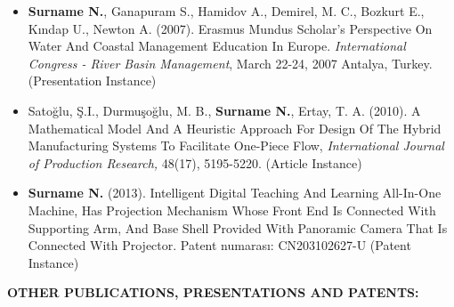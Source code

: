 \begin{itemize}

   \item {\bf Surname N.}, Ganapuram S., Hamidov A., Demirel, M. C., Bozkurt E., Kındap U., Newton A.
   (2007). Erasmus Mundus Scholar's Perspective On Water And Coastal
   Management Education In Europe. 
   \textit{International Congress - River Basin Management}, 
   March 22-24, 2007 Antalya, Turkey. (Presentation Instance)

   \item Satoğlu, Ş.I., Durmuşoğlu, M. B., {\bf Surname N.}, Ertay, T. A. (2010). A Mathematical Model 
   And A Heuristic Approach For Design Of The Hybrid Manufacturing Systems 
   To Facilitate One-Piece Flow, 
   \textit{International Journal of Production Research,}
   48(17), 5195-5220. (Article Instance)

   \item  {\bf Surname N.} (2013). Intelligent Digital Teaching And Learning All-In-One Machine,
   Has Projection Mechanism Whose Front End Is Connected With Supporting
   Arm, And Base Shell Provided With Panoramic Camera That Is Connected With
   Projector. Patent numarası: CN203102627-U (Patent Instance)
   
\end{itemize}

\textbf{OTHER PUBLICATIONS, PRESENTATIONS AND PATENTS:} 


